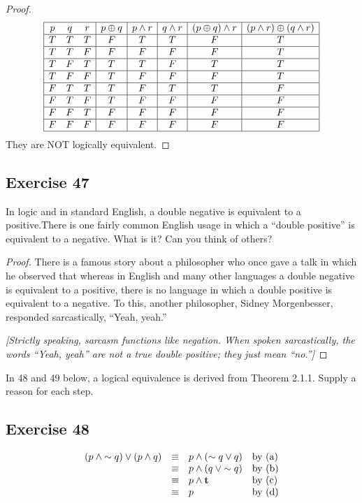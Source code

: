 \documentclass[14pt]{extarticle}
\begin{document}
\begin{proof} $$ \begin{array}{|ccc|c|c|c|c|c|} \hline p & q & r & p \oplus q &
p \wedge r & q \wedge r & (p \oplus q) \wedge r & (p \wedge r) \oplus (q \wedge
r) \\ \hline T & T & T & F & T & T & F & T \\ \hline T & T & F & F & F & F & F &
T \\ \hline T & F & T & T & T & F & T & T \\ \hline T & F & F & T & F & F & F &
T \\ \hline F & T & T & T & F & T & T & F \\ \hline F & T & F & T & F & F & F &
F \\ \hline F & F & T & F & F & F & F & F \\ \hline F & F & F & F & F & F & F &
F \\ \hline \end{array} $$ They are NOT logically equivalent. \end{proof}

\subsection{Exercise 47} In logic and in standard English, a double negative is
equivalent to a positive.There is one fairly common English usage in which a
“double positive” is equivalent to a negative. What is it? Can you think of
others?

\begin{proof} There is a famous story about a philosopher who once gave a talk
in which he observed that whereas in English and many other languages a double
negative is equivalent to a positive, there is no language in which a double
positive is equivalent to a negative. To this, another philosopher, Sidney
Morgenbesser, responded sarcastically, “Yeah, yeah.”

{\it [Strictly speaking, sarcasm functions like negation. When spoken
sarcastically, the words “Yeah, yeah” are not a true double positive; they just
mean “no.”]} \end{proof}

In 48 and 49 below, a logical equivalence is derived from Theorem 2.1.1. Supply
a reason for each step.

\subsection{Exercise 48} $$ \begin{array}{rcll} (p \wedge {\sim q}) \vee (p
\wedge q) & \equiv & p \wedge ({\sim q} \vee q) & \text{by (a)} \\ & \equiv & p
\wedge (q \vee {\sim q}) & \text{by (b)} \\ & \equiv & p \wedge {\bf t} & \text{by
(c)} \\ & \equiv & p & \text{by (d)} \\ \end{array} $$
\end{document}
